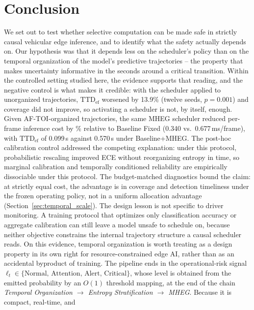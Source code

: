 \documentclass[a4paper,fleqn]{cas-dc}
\newcommand{\MHEG}{\mbox{MHEG}\xspace}
\begin{document}
\section{Conclusion}
\label{sec:conclusao}
We set out to test whether selective computation can be made safe in strictly
causal vehicular edge inference, and to identify what the safety actually
depends on. Our hypothesis was that it depends less on the scheduler's policy than
on the temporal organization of the model's predictive trajectories -- the property
that makes uncertainty informative in the seconds around a critical transition.
Within the controlled setting studied here, the evidence supports that reading, and
the negative control is what makes it credible: with the scheduler applied to
unorganized trajectories, $\mathrm{TTD}_{\mathrm{ef}}$ worsened by
{\color{\revcolor}13.9\% (twelve seeds, $p=0.001$)} and
coverage did not improve, so activating a scheduler is not, by itself, enough.
{\color{\revcolor}Given \mbox{AF-TOI}-organized trajectories, the same \MHEG
scheduler reduced per-frame inference cost by \CostReduction\% relative to
Baseline Fixed (0.340 vs.\ 0.677\,ms/frame), with
$\mathrm{TTD}_{\mathrm{ef}}$ of 0.099\,s against 0.570\,s under
Baseline+MHEG}. The post-hoc calibration control addressed the competing
explanation: under this protocol, probabilistic rescaling improved ECE without
reorganizing entropy in time, so marginal calibration and temporally
conditioned reliability are empirically dissociable under this protocol.
{\color{\revcolor}The budget-matched diagnostics bound the claim: at strictly
equal cost, the advantage is in coverage and detection timeliness under the
frozen operating policy, not in a uniform allocation advantage
(Section~\ref{sec:temporal_scale}).}
The design lesson is not specific to driver monitoring. A training protocol that
optimizes only classification accuracy or aggregate calibration can still leave a
model unsafe to schedule on, because neither objective constrains the internal
trajectory structure a causal scheduler reads. On this evidence, temporal
organization is worth treating as a design property in its own right for
resource-constrained edge AI, rather than as an accidental byproduct of training.
The pipeline ends in the operational-risk signal
$\ell_t \in \{\text{Normal},\, \text{Attention},\, \text{Alert},\, \text{Critical}\}$,
{\color{\revcolor}whose level is obtained from the emitted probability by an
$O(1)$ threshold mapping, at the end of the chain} \emph{Temporal Organization
$\rightarrow$ Entropy Stratification $\rightarrow$ MHEG}. Because it is compact, real-time, and
\end{document}
